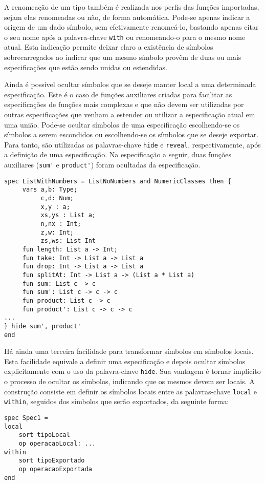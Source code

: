 A renomeação de um tipo também é realizada nos perfis das funções importadas, sejam elas renomeadas ou não, de forma automática.
Pode-se apenas indicar a origem de um dado símbolo, sem efetivamente renomeá-lo, bastando apenas citar o seu nome após a palavra-chave \Verb.with. ou renomeando-o para o mesmo nome atual.
Esta indicação permite deixar claro a existência de símbolos sobrecarregados ao indicar que um mesmo símbolo provêm de duas ou mais especificações que estão sendo unidas ou estendidas.

Ainda é possível ocultar símbolos que se deseje manter local a uma determinada especificação.
Este é o caso de funções auxiliares criadas para facilitar as especificações de funções mais complexas e que não devem ser utilizadas por outras especificações que venham a estender ou utilizar a especificação atual em uma união.
Pode-se ocultar símbolos de uma especificação escolhendo-se os símbolos a serem escondidos ou escolhendo-se os símbolos que se deseje exportar.
Para tanto, são utilizadas as palavras-chave \Verb.hide. e \Verb.reveal., respectivamente, após a definição de uma especificação.
Na especificação a seguir, duas funções auxiliares (\Verb.sum'. e \Verb.product'.) foram ocultadas da especificação.
\begin{Verbatim}
spec ListWithNumbers = ListNoNumbers and NumericClasses then {
     vars a,b: Type;
          c,d: Num;
          x,y : a;
          xs,ys : List a;
          n,nx : Int;
          z,w: Int;
          zs,ws: List Int
     fun length: List a -> Int;
     fun take: Int -> List a -> List a
     fun drop: Int -> List a -> List a
     fun splitAt: Int -> List a -> (List a * List a)
     fun sum: List c -> c
     fun sum': List c -> c -> c
     fun product: List c -> c
     fun product': List c -> c -> c
...
} hide sum', product'
end
\end{Verbatim}

Há ainda uma terceira facilidade para transformar símbolos em símbolos locais.
Esta facilidade equivale a definir uma especificação e depois ocultar símbolos explicitamente com o uso da palavra-chave \Verb.hide..
Sua vantagem é tornar implícito o processo de ocultar os símbolos, indicando que os mesmos devem ser locais.
A construção consiste em definir os símbolos locais entre as palavras-chave \Verb.local. e \Verb.within., seguidos dos símbolos que serão exportados, da seguinte forma:
\begin{Verbatim}
spec Spec1 = 
local 
	sort tipoLocal
	op operacaoLocal: ...
within
	sort tipoExportado
	op operacaoExportada
end
\end{Verbatim}

